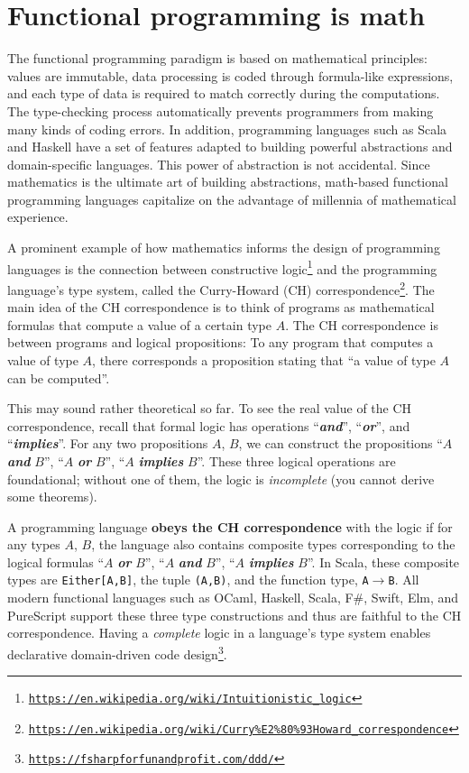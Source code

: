 \section{Functional programming is math}

The functional programming paradigm is based on mathematical principles:
values are immutable, data processing is coded through formula-like
expressions, and each type of data is required to match correctly
during the computations. The type-checking process automatically prevents
programmers from making many kinds of coding errors. In addition,
programming languages such as Scala and Haskell have a set of features
adapted to building powerful abstractions and domain-specific languages.
This power of abstraction is not accidental. Since mathematics is
the ultimate art of building abstractions, math-based functional programming
languages capitalize on the advantage of millennia of mathematical
experience.

A prominent example of how mathematics informs the design of programming
languages is the connection between constructive logic\footnote{\texttt{\href{https://en.wikipedia.org/wiki/Intuitionistic_logic}{https://en.wikipedia.org/wiki/Intuitionistic\_logic}}}
and the programming language's type system, called the Curry-Howard
(CH) correspondence\footnote{\texttt{\href{https://en.wikipedia.org/wiki/Curry\%E2\%80\%93Howard_correspondence}{https://en.wikipedia.org/wiki/Curry\%E2\%80\%93Howard\_correspondence}}}.
The main idea of the CH correspondence
is to think of programs as mathematical formulas that compute a value
of a certain type $A$. The CH correspondence is between programs
and logical propositions: To any program that computes a value of
type $A$, there corresponds a proposition stating that ``a value
of type $A$ can be computed''.

This may sound rather theoretical so far. To see the real value of
the CH correspondence, recall that formal logic has operations ``\textbf{\emph{and}}'',
``\textbf{\emph{or}}'', and ``\textbf{\emph{implies}}''. For any
two propositions $A$, $B$, we can construct the propositions ``$A$
\textbf{\emph{and}} $B$'', ``$A$ \textbf{\emph{or}} $B$'', ``$A$
\textbf{\emph{implies}} $B$''. These three logical operations are
foundational; without one of them, the logic is \emph{incomplete}
(you cannot derive some theorems).

A programming language \textbf{obeys the CH correspondence}
with the logic if for any types $A$, $B$, the language also contains
composite types corresponding to the logical formulas ``$A$ \textbf{\emph{or}}
$B$'', ``$A$ \textbf{\emph{and}} $B$'', ``$A$ \textbf{\emph{implies}}
$B$''. In Scala, these composite types are \texttt{Either{[}A,B{]}},
the tuple \texttt{(A,B)}, and the function type, \texttt{A$\rightarrow$B}.
All modern functional languages such as OCaml, Haskell, Scala, F\#,
Swift, Elm, and PureScript support these three type constructions
and thus are faithful to the CH correspondence. Having a \emph{complete}
logic in a language's type system enables declarative domain-driven
code design\footnote{\texttt{\href{https://fsharpforfunandprofit.com/ddd/}{https://fsharpforfunandprofit.com/ddd/}}}.

